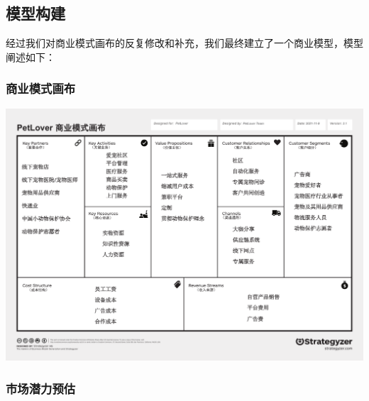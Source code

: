 \documentclass[a4paper]{ctexart}
\begin{document}
\subsection{模型构建}

经过我们对商业模式画布的反复修改和补充，我们最终建立了一个商业模型，模型阐述如下：

\subsubsection{商业模式画布}

\begin{center}
  \includegraphics[width=16cm]{the-business-model-canvas1}
\end{center}

\subsubsection{市场潜力预估}
\end{document}
